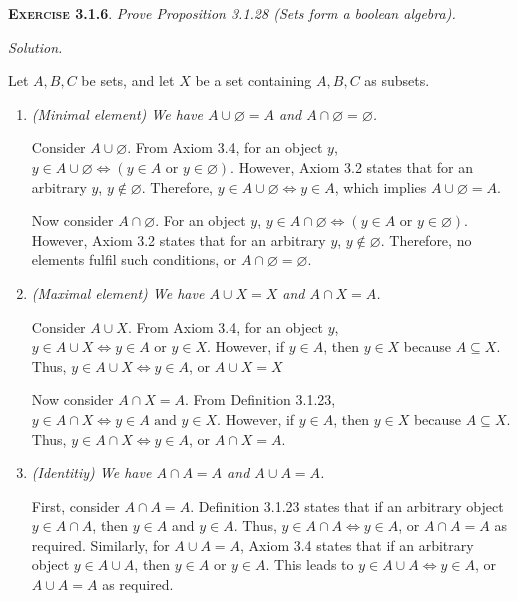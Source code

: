 \documentclass[12pt]{article}
\theoremstyle{remark}
\newenvironment{exer}[2]{
    \noindent \setlength{\parskip}{1em}%
    \textsc{\textbf{Exercise #1}}. \textit{#2} \par
    \noindent \textit{Solution.} %
}{\bigskip}
\begin{document}
\begin{exer}{3.1.6}{
    Prove Proposition 3.1.28 (Sets form a boolean algebra).
}
    Let $A, B, C$ be sets, and let $X$ be a set containing $A, B, C$ as subsets.
    \begin{enumerate}[topsep=0mm, label=(\alph*)]
        \item \textit{(Minimal element) We have $A \cup \varnothing = A$ and $A \cap \varnothing = \varnothing$.}

            Consider $A \cup \varnothing$.
            From Axiom 3.4, for an object $y$, $y \in A \cup \varnothing \iff (y \in A \text{ or } y \in \varnothing)$.
            However, Axiom 3.2 states that for an arbitrary $y$, $y \notin \varnothing$.
            Therefore, $y \in A \cup \varnothing \iff y \in A$, which implies $A \cup \varnothing = A$.

            Now consider $A \cap \varnothing$.
            For an object $y$, $y \in A \cap \varnothing \iff (y \in A \text{ or } y \in \varnothing)$.
            However, Axiom 3.2 states that for an arbitrary $y$, $y \notin \varnothing$.
            Therefore, no elements fulfil such conditions, or $A \cap \varnothing = \varnothing$.
        
        \item \textit{(Maximal element) We have $A \cup X = X$ and $A \cap X = A$.}

            Consider $A \cup X$.
            From Axiom 3.4, for an object $y$, $y \in A \cup X \iff y \in A \text{ or } y \in X$.
            However, if $y \in A$, then $y \in X$ because $A \subseteq X$.
            Thus, $y \in A \cup X \iff y \in A$, or $A \cup X = X$

            Now consider $A \cap X = A$.
            From Definition 3.1.23, $y \in A \cap X \iff y \in A \text{ and } y \in X$.
            However, if $y \in A$, then $y \in X$ because $A \subseteq X$.
            Thus, $y \in A \cap X \iff y \in A$, or $A \cap X = A$.
            
        \item \textit{(Identitiy) We have $A \cap A= A$ and $A \cup A = A$.}

            First, consider $A \cap A = A$.
            Definition 3.1.23 states that if an arbitrary object $y \in A \cap A$, then $y \in A$ and $y \in A$.
            Thus, $y \in A \cap A \iff y \in A$, or $A \cap A = A$ as required.
            Similarly, for $A \cup A = A$, Axiom 3.4 states that if an arbitrary object $y \in A \cup A$, then $y \in A$ or $y \in A$.
            This leads to $y \in A \cup A \iff y \in A$, or $A \cup A = A$ as required.


\end{enumerate}
\end{exer}
\end{document}
